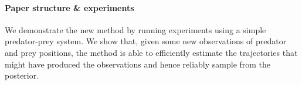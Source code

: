 \paragraph{Paper structure \& experiments}

We demonstrate the new method by running experiments using a simple predator-prey system. We show that, given some new observations of predator and prey positions, the method is able to efficiently estimate the trajectories that might have produced the observations and hence reliably sample from the posterior.


